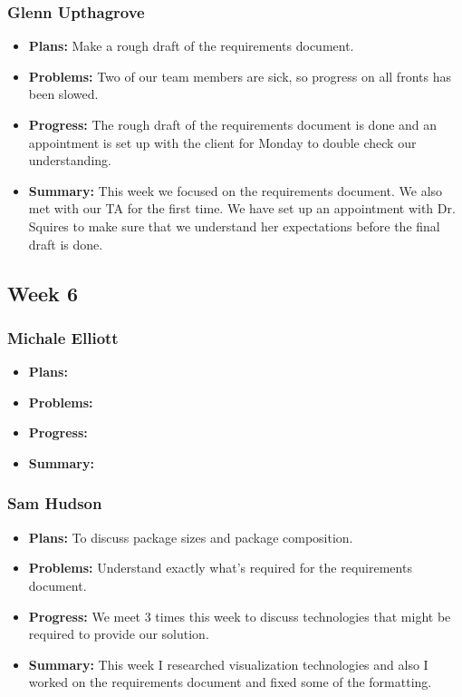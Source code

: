 \documentclass[onecolumn, draftclsnofoot,10pt, compsoc]{IEEEtran}
\begin{document}
\subsubsection{Glenn Upthagrove}
\begin {itemize}
 \item \textbf{Plans: }Make a rough draft of the requirements document.
 \item \textbf{Problems: }Two of our team members are sick, so progress on all fronts has been slowed.
 \item \textbf{Progress: }The rough draft of the requirements document is done and an appointment is set up with the client for Monday to double check our understanding. 
 \item \textbf{Summary: }This week we focused on the requirements document. We also met with our TA for the first time. We have set up an appointment with Dr. Squires to make sure that we understand her expectations before the final draft is done.  
\end {itemize}
\subsection {Week 6}
\subsubsection{Michale Elliott}
\begin {itemize}
 \item \textbf{Plans: }
 \item \textbf{Problems: }
 \item \textbf{Progress: }
 \item \textbf{Summary: }
\end {itemize}
\subsubsection{Sam Hudson}
\begin {itemize}
\item \textbf{Plans: }To discuss package sizes and package composition.
\item \textbf{Problems: }Understand exactly what’s required for the requirements document.
\item \textbf{Progress: }We meet 3 times this week to discuss technologies that might be required to provide our solution.
\item \textbf{Summary: }This week I researched visualization technologies and also I worked on the requirements document and fixed some of the formatting.
\end {itemize}
\end{document}
